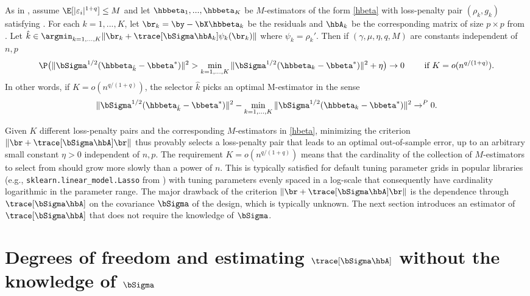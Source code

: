 \documentclass{colt2022} %
\def\eps{\varepsilon}
\numberwithin{equation}{section}
\begin{document}
\begin{corollary}
    \label{corSelection2}
    As in , assume $\E[|\eps_i|^{1+q}]\le M$
    and let $\hbbeta_1,...,\hbbeta_K$ be $M$-estimators of the form
    \eqref{hbeta} with loss-penalty pair $(\rho_k,g_k)$
    satisfying .
    For each $k=1,...,K$, let $\br_k = \by - \bX\hbbeta_k$
    be the residuals and $\hbA_k$ be the corresponding matrix of size $p\times p$
    from .
    Let $\hat k \in \argmin_{k=1,...,K}\|\br_k +\trace[\bSigma\hbA_k]\psi_k(\br_k)\|$ where $\psi_k=\rho_k'$.
    Then if $(\gamma,\mu,\eta,q,M)$ are constants independent of $n,p$
    \begin{equation*}
    \P\bigl(
        \|\bSigma^{1/2}(\hbbeta_{\hat k}-\bbeta^*)\|^2
        >
        \min_{k=1,...,K}
        \|\bSigma^{1/2}(\hbbeta_k-\bbeta^*)\|^2 
        + \eta
    \bigr)
    \to 0 
    \qquad \text{ if }
    K=o(n^{q/(1+q)}).
    \end{equation*}
    In other words,
    if $K=o(n^{q/(1+q)})$, the selector $\hat k$ picks an optimal
    M-estimator in the sense
    $$\|\bSigma^{1/2}(\hbbeta_{\hat k}-\bbeta^*)\|^2
    -
    \min_{k=1,...,K}
    \|\bSigma^{1/2}(\hbbeta_k-\bbeta^*)\|^2 
    \to^P 0.
    $$
\end{corollary}

Given $K$ different loss-penalty pairs
and the corresponding $M$-estimators in \eqref{hbeta},
minimizing the criterion $\|\br + \trace[\bSigma \hbA]\br\|$ thus provably
selects a loss-penalty pair that leads to an optimal out-of-sample
error, up to an arbitrary small constant $\eta>0$ independent of $n,p$.
The requirement $K=o(n^{q/(1+q)})$ means that the cardinality
of the collection of $M$-estimators to select from should grow
more slowly than a power of $n$. This is typically satisfied
for default tuning parameter grids in popular libraries
(e.g., \verb|sklearn.linear_model.Lasso| from \cite{pedregosa2011scikit})
with tuning parameters evenly spaced in a log-scale that
consequently have cardinality logarithmic in the parameter range.
The major drawback of the criterion $\|\br + \trace[\bSigma \hbA]\br\|$
is the dependence through $\trace[\bSigma \hbA]$
on the covariance $\bSigma$ of the design,
which is typically unknown. The next section introduces an
estimator of $\trace[\bSigma \hbA]$ that does not require the knowledge of
$\bSigma$.


\section{Degrees of freedom and estimating 
\texorpdfstring{$\trace[\bSigma\hbA]$}{tr[bSigma hbA]}
without the knowledge of 
\texorpdfstring{$\bSigma$}{bSigma}}
\label{sec:edf}
\end{document}
